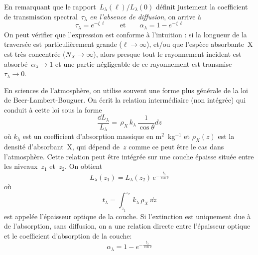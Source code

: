 En remarquant que le rapport~$L_\lambda(\ell) / L_\lambda(0)$ définit justement la coefficient de transmission spectral~$\tau_\lambda$ \emph{en l'absence de diffusion}, on arrive à
\[ \tau_\lambda = e^{- \zeta \, \ell} \qquad \textrm{et} \qquad \alpha_\lambda = 1 - e^{- \zeta \, \ell} \]
On peut vérifier que l'expression est conforme à l'intuition : si la longueur de la traversée est particulièrement grande ($\ell \rightarrow \infty$), et/ou que l'espèce absorbante~X est très concentrée ($N_X \rightarrow \infty$), alors presque tout le rayonnement incident est absorbé~$\alpha_\lambda \rightarrow 1$ et une partie négligeable de ce rayonnement est transmise~$\tau_\lambda \rightarrow 0$. 

\sk
En sciences de l'atmosphère, on utilise souvent une forme plus générale de la loi de Beer-Lambert-Bouguer. On écrit la relation intermédiaire (non intégrée) qui conduit à cette loi sous la forme 
\[ \frac{\dd L_\lambda}{L_\lambda} = \, \rho_X \, k_\lambda \, \frac{1}{\cos\theta}  dz \]
où $k_\lambda$ est un coefficient d'absorption massique en m$^2$~kg$^{-1}$ et $\rho_X(z)$ est la densité d'absorbant~X, qui dépend de~$z$ comme ce peut être le cas dans l'atmosphère. Cette relation peut être intégrée sur une couche épaisse située entre les niveaux~$z_1$ et~$z_2$. On obtient 
\[ L_\lambda(z_1) = L_\lambda(z_2) \, e^{- \frac{t_\lambda}{\cos\theta}} \]
où 
\[ t_\lambda = \int_{z_1}^{z_2} \, k_\lambda \, \rho_X \, \dd z \]
est appelée l'épaisseur optique de la couche. Si l'extinction est uniquement due à de l'absorption, sans diffusion, on a une relation directe entre l'épaisseur optique et le coefficient d'absorption de la couche: 
\[\alpha_\lambda = 1 - e^{- \frac{t_\lambda}{\cos\theta}} \]
